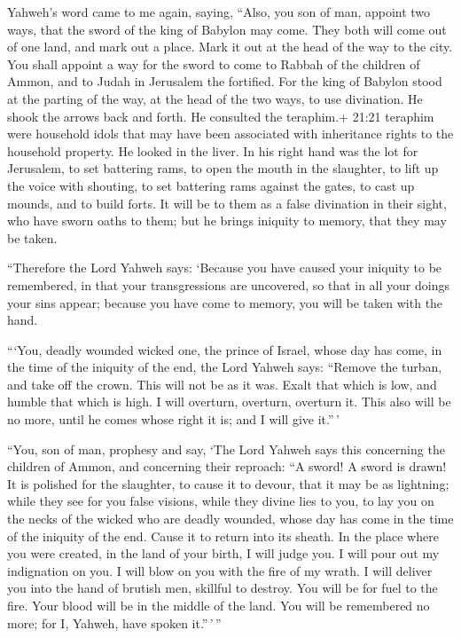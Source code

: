  Yahweh's word came to me again, saying, 
``Also, you son of man, appoint two ways, that the sword of the king of
Babylon may come. They both will come out of one land, and mark out a
place. Mark it out at the head of the way to the city.  You
shall appoint a way for the sword to come to Rabbah of the children of
Ammon, and to Judah in Jerusalem the fortified.  For the
king of Babylon stood at the parting of the way, at the head of the two
ways, to use divination. He shook the arrows back and forth. He
consulted the teraphim.+ 21:21 teraphim were household idols that may
have been associated with inheritance rights to the household property.
He looked in the liver.  In his right hand was the lot for
Jerusalem, to set battering rams, to open the mouth in the slaughter, to
lift up the voice with shouting, to set battering rams against the
gates, to cast up mounds, and to build forts.  It will be
to them as a false divination in their sight, who have sworn oaths to
them; but he brings iniquity to memory, that they may be taken.

 ``Therefore the Lord Yahweh says: `Because you have caused
your iniquity to be remembered, in that your transgressions are
uncovered, so that in all your doings your sins appear; because you have
come to memory, you will be taken with the hand.

 ```You, deadly wounded wicked one, the prince of Israel,
whose day has come, in the time of the iniquity of the end,
 the Lord Yahweh says: ``Remove the turban, and take off
the crown. This will not be as it was. Exalt that which is low, and
humble that which is high.  I will overturn, overturn,
overturn it. This also will be no more, until he comes whose right it
is; and I will give it.''\,'

 ``You, son of man, prophesy and say, `The Lord Yahweh says
this concerning the children of Ammon, and concerning their reproach:
``A sword! A sword is drawn! It is polished for the slaughter, to cause
it to devour, that it may be as lightning;  while they see
for you false visions, while they divine lies to you, to lay you on the
necks of the wicked who are deadly wounded, whose day has come in the
time of the iniquity of the end.  Cause it to return into
its sheath. In the place where you were created, in the land of your
birth, I will judge you.  I will pour out my indignation on
you. I will blow on you with the fire of my wrath. I will deliver you
into the hand of brutish men, skillful to destroy.  You
will be for fuel to the fire. Your blood will be in the middle of the
land. You will be remembered no more; for I, Yahweh, have spoken
it.''\,'\,''

